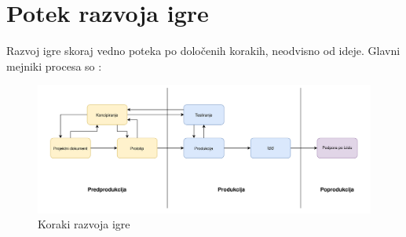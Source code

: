 \documentclass[12pt,a4paper,twoside]{book}
\begin{document}
\section{Potek razvoja igre}
Razvoj igre skoraj vedno poteka po določenih korakih, neodvisno od ideje. Glavni mejniki procesa so \cite{jainGameDevelopmentCycle}:
\begin{figure}[h]
	\centering
	\includegraphics[width=15cm]{LifeCycle}
	\caption{Koraki razvoja igre}
	\label{slika:lifeCycle}
\end{figure}
\end{document}
